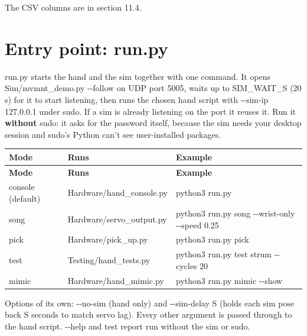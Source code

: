 \documentclass[11pt,letterpaper]{article}
\newcommand{\code}[1]{\textcolor{codeblue}{\ttfamily\smaller\relax #1}}
\begin{document}
The CSV columns are in section 11.4.


\section{Entry point: run.py}
\code{run.py} starts the hand and the sim together with one command. It opens \code{Sim/\allowbreak{}mvmnt\_\allowbreak{}demo.py -{}-{}follow} on UDP port 5005, waits up to \code{SIM\_\allowbreak{}WAIT\_\allowbreak{}S} (20 s) for it to start listening, then runs the chosen hand script with \code{-{}-{}sim-{}\allowbreak{}ip 127.0.0.1} under sudo. If a sim is already listening on the port it reuses it. Run it \textbf{without} sudo: it asks for the password itself, because the sim needs your desktop session and sudo's Python can't see user-installed packages.

{\small
\begin{longtable}{|>{\raggedright\arraybackslash}p{}|>{\raggedright\arraybackslash}p{}|>{\raggedright\arraybackslash}p{}|}
\hline
\rowcolor{tblhead}\textbf{Mode} & \textbf{Runs} & \textbf{Example} \\ \hline
\endfirsthead
\hline
\rowcolor{tblhead}\textbf{Mode} & \textbf{Runs} & \textbf{Example} \\ \hline
\endhead
\code{console} (default) & \code{Hardware/\allowbreak{}hand\_\allowbreak{}console.py} & \code{python3 run.py} \\ \hline
\code{song} & \code{Hardware/\allowbreak{}servo\_\allowbreak{}output.py} & \code{python3 run.py song -{}-{}wrist-{}\allowbreak{}only -{}-{}speed 0.25} \\ \hline
\code{pick} & \code{Hardware/\allowbreak{}pick\_\allowbreak{}up.py} & \code{python3 run.py pick} \\ \hline
\code{test} & \code{Testing/\allowbreak{}hand\_\allowbreak{}tests.py} & \code{python3 run.py test strum -{}-{}cycles 20} \\ \hline
\code{mimic} & \code{Hardware/\allowbreak{}hand\_\allowbreak{}mimic.py} & \code{python3 run.py mimic -{}-{}show} \\ \hline
\end{longtable}}

Options of its own: \code{-{}-{}no-{}\allowbreak{}sim} (hand only) and \code{-{}-{}sim-{}\allowbreak{}delay S} (holds each sim pose back S seconds to match servo lag). Every other argument is passed through to the hand script. \code{-{}-{}help} and \code{test report} run without the sim or sudo.
\end{document}
